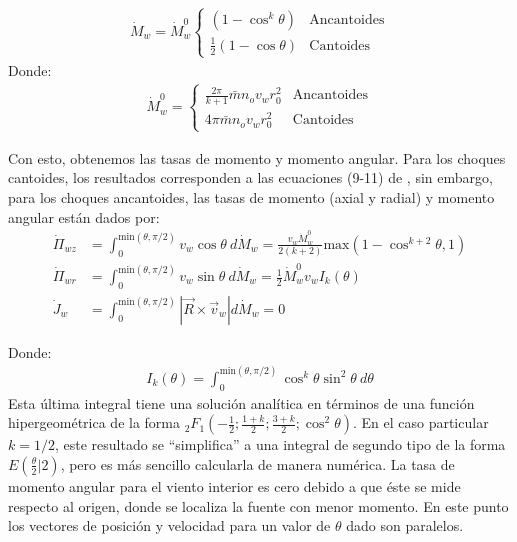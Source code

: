 \begin{align}
  \dot{M}_w = \dot{M}^0_w\left\lbrace
  \begin{array}{lr}
    \left(1 - \cos^k\theta\right) & \mathrm{Ancantoides} \\
    \frac{1}{2} \left(1 - \cos\theta\right) & \mathrm{Cantoides}
  \end{array}\right.
\end{align}
Donde:
\begin{align}
  \dot{M}^0_w = \left\lbrace
  \begin{array}{lr}
    \frac{2\pi}{k+1}\bar{m}n_o v_w r_0^2 & \mathrm{Ancantoides} \\
    4\pi \bar{m}n_o v_w r_0^2 & \mathrm{Cantoides}
  \end{array}\right.
\end{align}

Con esto, obtenemos las tasas de momento y momento angular. Para los choques cantoides, los resultados corresponden a las ecuaciones (9-11) de \CRW{}, sin embargo, para los choques ancantoides, las tasas de momento (axial y radial) y momento angular están dados por:
\begin{align}
  \dot{\Pi}_{wz} &= \int^{\mathrm{min}(\theta, \pi/2)}_0 v_w\cos\theta~d\dot{M}_w = \frac{v_w \dot{M}^0_w}{2\left(k+2\right)}\mathrm{max}\left(1 - \cos^{k+2}\theta, 1\right) \label{eq:Pi-wz} \\
  \dot{\Pi}_{wr} &= \int^{\mathrm{min}(\theta, \pi/2)}_0 v_w\sin\theta~d\dot{M}_w = \frac{1}{2}\dot{M}^0_w v_w I_k(\theta) \\
  \dot{J}_w &= \int^{\mathrm{min}(\theta, \pi/2)}_0 |\vec{R} \times \vec{v}_w|d\dot{M}_w = 0 \label{eq:inner-dot-J}
\end{align}

Donde:
\begin{align}
  I_k(\theta) = \int^{\mathrm{min}(\theta, \pi/2)}_0 \cos^k\theta \sin^2\theta~d\theta \label{eq:Ikt}
\end{align}
 Esta última integral tiene una solución analítica en términos de una función hipergeométrica de la forma ${}_2F_1\left(-\frac{1}{2}; \frac{1+k}{2}; \frac{3+k}{2}; \cos^2\theta\right)$. En el caso particular $k=1/2$, este resultado se ``simplifica'' a una integral de segundo tipo de la forma $E\left(\frac{\theta}{2} | 2\right)$, pero es más sencillo calcularla de manera numérica. La tasa de momento angular para el viento interior es cero debido a que éste se mide respecto al origen, donde se localiza la fuente con menor momento. En este punto los vectores de posición y velocidad para un valor de $\theta$ dado son paralelos.

